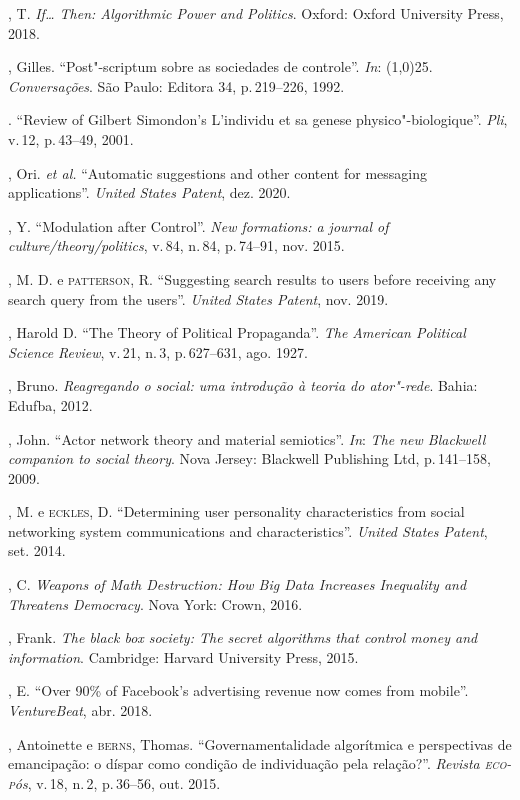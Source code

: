\begin{bibliohedra}
, T. \textit{If\ldots{} Then: Algorithmic Power and Politics}. Oxford:
Oxford University Press, 2018.

, Gilles. ``Post"-scriptum sobre as sociedades de controle''. \textit{In}:
\line(1,0){25}. \textit{Conversações}. São Paulo: Editora 34, p.\,219--226, 1992.

\titidem. ``Review of Gilbert Simondon's L'individu et sa
genese physico"-biologique''. \textit{Pli}, v.\,12, p.\,43--49, 2001.

, Ori. \textit{et al.} ``Automatic suggestions and other
content for messaging applications''. \textit{United States Patent}, dez. 2020.

, Y. ``Modulation after Control''. \textit{New formations: a journal of
culture/theory/politics}, v.\,84, n.\,84, p.\,74--91, nov. 2015.

, M. D. e \textsc{patterson}, R. ``Suggesting search results to users
before receiving any search query from the users''. \textit{United States Patent}, nov. 2019. 


, Harold D. ``The Theory of Political Propaganda''. \textit{The
American Political Science Review}, v.\,21, n.\,3, p.\,627--631, ago. 1927.

, Bruno. \textit{Reagregando o social: uma introdução à teoria do
ator"-rede}. Bahia: Edufba, 2012.

, John. ``Actor network theory and material semiotics''. \textit{In}: \textit{The
new Blackwell companion to social theory}. Nova Jersey: Blackwell Publishing Ltd, p.\,141--158, 2009.

, M. e \textsc{eckles}, D. ``Determining user personality
characteristics from social networking system communications and
characteristics''. \textit{United States Patent}, set. 2014.

, C. \textit{Weapons of Math Destruction: How \textit{Big Data} Increases
Inequality and Threatens Democracy}. Nova York: Crown, 2016.

, Frank. \textit{The black box society: The secret algorithms
that control money and information}. Cambridge: Harvard University Press, 2015.

, E. ``Over 90\% of Facebook's advertising revenue now comes
from mobile''. \textit{VentureBeat}, abr. 2018.

, Antoinette e \textsc{berns}, Thomas. ``Governamentalidade
algorítmica e perspectivas de emancipação: o díspar como condição de
individuação pela relação?''. \textit{Revista \textsc{eco-p}ós}, v.\,18,
n.\,2, p.\,36--56, out. 2015.


\end{bibliohedra}

